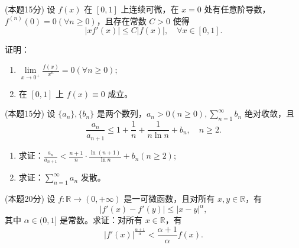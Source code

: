 \documentclass[loose]{ExBook}
\begin{document}
\begin{qitems}
    \begin{bbox}
        \qitem (本题15分) 设 \( f(x) \) 在 \([0, 1]\) 上连续可微，在 \( x = 0 \) 处有任意阶导数，\( f^{(n)}(0) = 0 (\forall n \geq 0) \)，且存在常数 \( C > 0 \) 使得 \[ |xf'(x)| \leq C|f(x)|, \quad \forall x \in [0, 1]. \]
        
        证明：
        \begin{enumerate}[label=(\arabic*)]
            \item \( \lim\limits_{x \to 0^{+}} \frac{f(x)}{x^n} = 0 (\forall n \geq 0); \)
            \item 在 \([0, 1]\) 上 \( f(x) \equiv 0 \) 成立。
        \end{enumerate}
    \end{bbox}
 \begin{bbox}
        \qitem (本题15分) 设 \(\{a_n\}, \{b_n\}\) 是两个数列，\(a_n > 0 (n \geq 0), \sum_{n=1}^{\infty} b_n\) 绝对收敛，且
        \[
        \frac{a_n}{a_{n+1}} \leq 1 + \frac{1}{n} + \frac{1}{n \ln n} + b_n, \quad n \geq 2.
        \]
        
        \begin{enumerate}[label=(\arabic*)]
            \item 求证：\(\frac{a_n}{a_{n+1}} < \frac{n+1}{n} \cdot \frac{\ln(n+1)}{\ln n} + b_n (n \geq 2)\);
            \item 求证：\(\sum_{n=1}^{\infty} a_n\) 发散。
        \end{enumerate}
    \end{bbox}

    \begin{bbox}
        \qitem (本题20分) 设 \(f: \mathbb{R} \to (0,+\infty)\) 是一可微函数，且对所有 \(x,y \in \mathbb{R}\)，有
        \[
        |f'(x) - f'(y)| \leq |x-y|^\alpha,
        \]
        其中 \(\alpha \in (0,1]\) 是常数。求证：对所有 \(x \in \mathbb{R}\)，有
        \[
        |f'(x)|^{\frac{\alpha+1}{\alpha}} < \frac{\alpha+1}{\alpha} f(x).
        \]
    \end{bbox}
\end{qitems}
\end{document}
